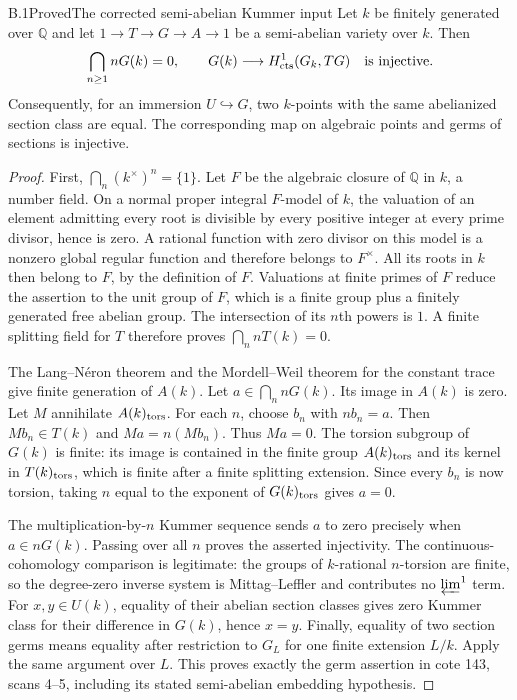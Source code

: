 \begin{statement}{B.1}{Proved}{The corrected semi-abelian Kummer input}
Let $k$ be finitely generated over $\mathbb Q$ and let
$1\to T\to G\to A\to1$ be a semi-abelian variety over $k$.
Then
\[
 \bigcap_{n\geq1}nG(k)=0,
 \qquad G(k)\longrightarrow H^1_{\rm cts}(G_k,TG)
 \quad\hbox{is injective}.
\]
Consequently, for an immersion $U\hookrightarrow G$, two $k$-points with
the same abelianized section class are equal.  The corresponding map on
algebraic points and germs of sections is injective.
\end{statement}
\begin{proof}
First, $\bigcap_n(k^\times)^n=\{1\}$.  Let $F$ be the algebraic closure of
$\mathbb Q$ in $k$, a number field.  On a normal proper integral $F$-model
of $k$, the valuation of an element admitting every root is divisible by
every positive integer at every prime divisor, hence is zero.  A rational
function with zero divisor on this model is a nonzero global regular
function and therefore belongs to $F^\times$.  All its roots in $k$ then
belong to $F$, by the definition of $F$.  Valuations at finite primes of
$F$ reduce the assertion to the unit group of $F$, which is a finite group
plus a finitely generated free abelian group.  The intersection of its
$n$th powers is $1$.  A finite splitting field for $T$ therefore proves
$\bigcap_n nT(k)=0$.

The Lang--N\'eron theorem and the Mordell--Weil theorem for the constant
trace give finite generation of $A(k)$.  Let $a\in\bigcap_n nG(k)$.
Its image in $A(k)$ is zero.  Let $M$ annihilate $A(k)_{\rm tors}$.
For each $n$, choose $b_n$ with $nb_n=a$.  Then $Mb_n\in T(k)$ and
$Ma=n(Mb_n)$.  Thus $Ma=0$.  The torsion subgroup of $G(k)$ is finite:
its image is contained in the finite group $A(k)_{\rm tors}$ and its
kernel in $T(k)_{\rm tors}$, which is finite after a finite splitting
extension.  Since every $b_n$ is now torsion, taking $n$ equal to the
exponent of $G(k)_{\rm tors}$ gives $a=0$.

The multiplication-by-$n$ Kummer sequence sends $a$ to zero precisely
when $a\in nG(k)$.  Passing over all $n$ proves the asserted injectivity.
The continuous-cohomology comparison is legitimate: the groups of
$k$-rational $n$-torsion are finite, so the degree-zero inverse system
is Mittag--Leffler and contributes no $\varprojlim^1$ term.
For $x,y\in U(k)$, equality of their abelian section classes gives zero
Kummer class for their difference in $G(k)$, hence $x=y$.
Finally, equality of two section germs means equality after restriction
to $G_L$ for one finite extension $L/k$.  Apply the same argument over
$L$.  This proves exactly the germ assertion in cote 143, scans 4--5,
including its stated semi-abelian embedding hypothesis.
\end{proof}


